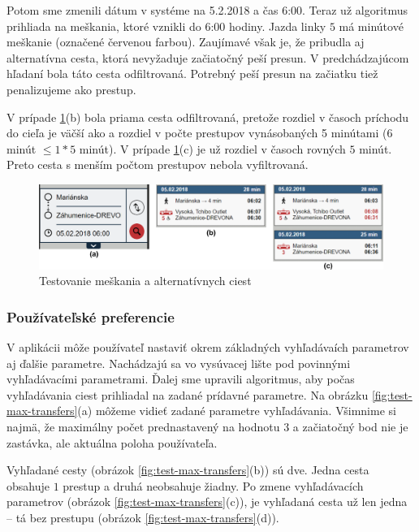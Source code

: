 Potom sme zmenili dátum v systéme na 5.2.2018 a čas 6:00. Teraz už algoritmus prihliada na meškania, ktoré vznikli do 6:00 hodiny. Jazda linky $5$ má minútové meškanie (označené červenou farbou). Zaujímavé však je, že pribudla aj alternatívna cesta, ktorá nevyžaduje začiatočný peší presun. V predchádzajúcom hľadaní bola táto cesta odfiltrovaná. Potrebný peší presun na začiatku tiež penalizujeme ako prestup. 
 
V prípade \ref{fig:test-delay-alternative}(b) bola priama cesta odfiltrovaná, pretože rozdiel v časoch príchodu do cieľa je väčší ako a rozdiel v počte prestupov vynásobaných 5 minútami ($6$ minút $\leq 1*5$ minút).
V prípade \ref{fig:test-delay-alternative}(c) je už rozdiel v časoch rovných $5$ minút. Preto cesta s menším počtom prestupov nebola vyfiltrovaná.

\begin{figure}[H]
\centerline{\includegraphics[width=1.0\textwidth]{images/test/delay-alternative}}
\caption[Testovanie meškania a alternatívnych ciest]{Testovanie meškania a alternatívnych ciest}
\label{fig:test-delay-alternative}
\end{figure}

\subsubsection{Používateľské preferencie}

V aplikácii môže používateľ nastaviť okrem základných vyhľadávaích parametrov aj ďalšie parametre. Nachádzajú sa vo vysúvacej lište pod povinnými vyhľadávacími parametrami. Ďalej sme upravili algoritmus, aby počas vyhľadávania ciest prihliadal na zadané prídavné parametre. Na obrázku \ref{fig:test-max-transfers}(a) môžeme vidieť zadané parametre vyhľadávania. Všimnime si najmä, že maximálny počet prednastavený na hodnotu $3$ a začiatočný bod nie je zastávka, ale aktuálna poloha používateľa. 

Vyhľadané cesty (obrázok \ref{fig:test-max-transfers}(b)) sú dve. Jedna cesta obsahuje $1$ prestup a druhá neobsahuje žiadny. Po zmene vyhľadávacích parametrov (obrázok \ref{fig:test-max-transfers}(c)), je vyhľadaná cesta už len jedna – tá bez prestupu (obrázok \ref{fig:test-max-transfers}(d)).

